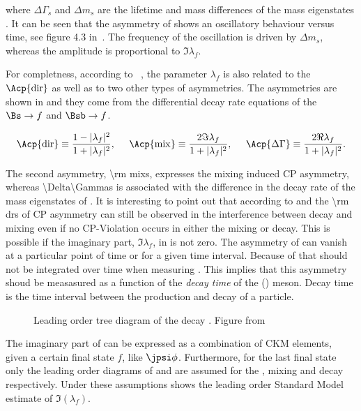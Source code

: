 \noindent where $\Delta\Gamma_s$ and $\Delta m_s$ are the lifetime and mass differences of the mass eigenstates .
It can be seen that the asymmetry of  shows an oscillatory behaviour versus time, see figure 4.3 in~\cite{jeroenThesis}.
The frequency of the oscillation is driven by $\Delta m_s$, whereas the amplitude is proportional to $\Im\lambda_f$.

For completness, according to ~\cite{DeBruyn-thesis,jeroenThesis}, the parameter $\lambda_f$ is also related to the $\Acp{\rm dir}$ as well as to two
other types of asymmetries. The asymmetries are shown in  and they come from the differential decay rate equations of the $\Bs\to f$
 and $\Bsb\to f$.

\begin{equation}
  \Acp{\rm dir}      \equiv \frac{ 1-|\lambda_f|^2} {1 + |\lambda_f|^2},\;\;\;\;\;
  \Acp{\rm mix}      \equiv \frac{ 2 \Im\lambda_f} {1 + |\lambda_f|^2},\;\;\;\;\;
  \Acp{\Delta\Gamma} \equiv \frac{ 2 \Re\lambda_f} {1 + |\lambda_f|^2}.
\label{cp_asym_lambda}
\end{equation}

The second asymmetry, \Acp{\rm mix}, expresses the mixing induced CP asymmetry, whereas \Acp{\Delta\Gamma} is associated with the
difference in the decay rate of the mass eigenstates of . It is interesting to point out that according
to  and the \Acp{\rm dr} of  CP asymmetry can still be observed in the interference between decay and
mixing even if no CP-Violation occurs in either the mixing or decay. This is possible if the imaginary part, $\Im\lambda_f$, in  is not zero.
The asymmetry of  can vanish at a particular point of time or for a given time interval. Because of that  should not
be integrated over time when measuring \phis. This implies that this asymmetry shoud be measasured as a function of the
{\it decay time} of the \Bs (\Bsb) meson. Decay time is the time interval between the production and decay of a particle.

\begin{figure}[h]
  \centering
  {\sffamily }
  \caption{Leading order tree diagram of the decay \BsJpsiPhi. Figure from~\cite{jeroenThesis}}
  \label{bs2jpsiphi}
\end{figure}

The imaginary part of  can be expressed as a combination of CKM elements, given a certain final state $f$, like $\jpsi\phi$.
Furthermore, for the last final state only the leading order diagrams of  and  are assumed for the \Bs, \Bsb
mixing and decay respectively. Under these assumptions  shows the leading order Standard Model estimate of $\Im(\lambda_f)$.

